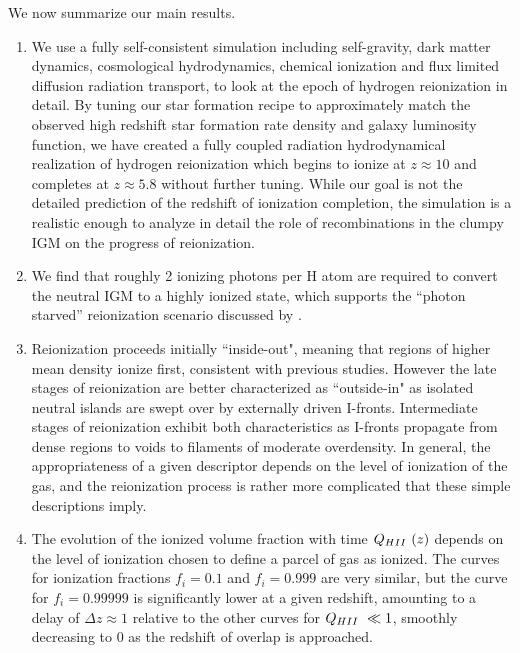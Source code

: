 We now summarize our main results.
\begin{enumerate}
\item
We use a fully self-consistent simulation including self-gravity, dark
matter dynamics, cosmological hydrodynamics, chemical ionization and
flux limited diffusion radiation transport, to look at the epoch of hydrogen
reionization in detail. By tuning our star formation recipe to approximately match the observed high redshift star formation rate density and galaxy luminosity function, we have created a fully coupled radiation hydrodynamical realization of hydrogen reionization which begins to ionize at $z \approx 10$ and completes at $z \approx 5.8$ without further tuning. While our goal is not the detailed prediction of the redshift of ionization completion, the simulation is a realistic enough to analyze in detail the role of recombinations in the clumpy IGM on the progress of reionization. 
\item
We find that roughly 2 ionizing photons per H atom are required to convert the neutral IGM to a highly ionized state, which supports the ``photon starved'' reionization scenario discussed by \cite{BoltonHaehnelt2007}.
\item
Reionization proceeds initially ``inside-out", meaning that regions of higher mean density  ionize first, consistent with previous studies. However the late stages of reionization are better characterized as ``outside-in" as isolated neutral islands are swept over by externally driven I-fronts. Intermediate stages of reionization exhibit both characteristics as I-fronts propagate from dense regions to voids to filaments of moderate overdensity. In general, the appropriateness of a given descriptor depends on the level of ionization of the gas, and the reionization process is rather more complicated that these simple descriptions imply. 
\item
The evolution of the ionized volume fraction with time $Q_{\hii}(z)$ depends on the level of ionization chosen to define a parcel of gas as ionized. The curves for ionization fractions $f_i = 0.1$ and $f_i =0.999$ are very similar, but the curve for $f_i =0.99999$ is significantly lower at a given redshift, amounting to a delay of $\Delta z \approx 1$ relative to the other curves for $Q_{\hii} \ll 1$, smoothly decreasing to 0 as the redshift of overlap is approached.


\end{enumerate}

